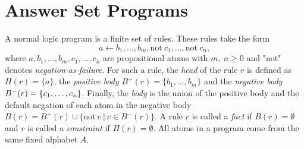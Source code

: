 \section{Answer Set Programs}
\label{sec:Preliminaries on answer set programming/Answer Set Programs}

A normal logic program is a finite set of rules. These rules take the form
\[
    a \leftarrow b_1, \ldots , b_m, \text{not}\ c_1, \ldots , \text{not}\ c_n,
\]
where \(a, b_1, \ldots , b_m, c_1, \ldots ,c_n\) are propositional atoms with \(m,\ n \geq 0\) and "not" denotes \emph{negation-as-failure}. For such a rule, the \emph{head} of the rule $r$ is defined as \(H(r) = \{a\}\), the \emph{positive body} \(B^+(r) = \{ b_1, \ldots , b_m\}\) and the \emph{negative body} \(B^-(r) = \nolinebreak \{c_1, \ldots ,c_n\}\). Finally, the \emph{body} is the union of the positive body and the default negation of each atom in the negative body \(B(r) = B^+(r) \cup \{\text{not}\ c\ |\ c \in B^-(r)\}\). A rule $r$ is called a \emph{fact} if \(B(r) = \emptyset\) and $r$ is called a \emph{constraint} if \(H(r) = \emptyset\).
All atoms in a program come from the same fixed alphabet $A$.

